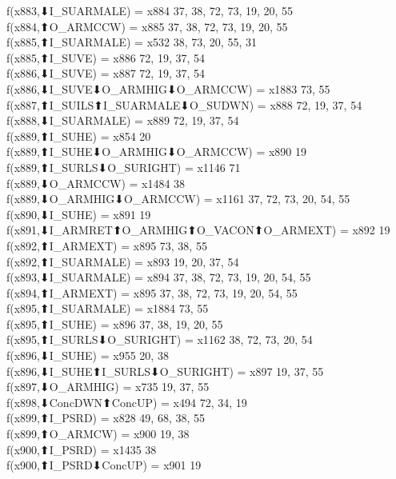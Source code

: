 f(x883,⬇I_SUARMALE) = x884 {37, 38, 72, 73, 19, 20, 55} \\
f(x884,⬆O_ARMCCW) = x885 {37, 38, 72, 73, 19, 20, 55} \\
f(x885,⬆I_SUARMALE) = x532 {38, 73, 20, 55, 31} \\
f(x885,⬆I_SUVE) = x886 {72, 19, 37, 54} \\
f(x886,⬇I_SUVE) = x887 {72, 19, 37, 54} \\
f(x886,⬇I_SUVE⬇O_ARMHIG⬇O_ARMCCW) = x1883 {73, 55} \\
f(x887,⬆I_SUILS⬆I_SUARMALE⬇O_SUDWN) = x888 {72, 19, 37, 54} \\
f(x888,⬇I_SUARMALE) = x889 {72, 19, 37, 54} \\
f(x889,⬆I_SUHE) = x854 {20} \\
f(x889,⬆I_SUHE⬇O_ARMHIG⬇O_ARMCCW) = x890 {19} \\
f(x889,⬆I_SURLS⬇O_SURIGHT) = x1146 {71} \\
f(x889,⬇O_ARMCCW) = x1484 {38} \\
f(x889,⬇O_ARMHIG⬇O_ARMCCW) = x1161 {37, 72, 73, 20, 54, 55} \\
f(x890,⬇I_SUHE) = x891 {19} \\
f(x891,⬇I_ARMRET⬆O_ARMHIG⬆O_VACON⬆O_ARMEXT) = x892 {19} \\
f(x892,⬆I_ARMEXT) = x895 {73, 38, 55} \\
f(x892,⬆I_SUARMALE) = x893 {19, 20, 37, 54} \\
f(x893,⬇I_SUARMALE) = x894 {37, 38, 72, 73, 19, 20, 54, 55} \\
f(x894,⬆I_ARMEXT) = x895 {37, 38, 72, 73, 19, 20, 54, 55} \\
f(x895,⬆I_SUARMALE) = x1884 {73, 55} \\
f(x895,⬆I_SUHE) = x896 {37, 38, 19, 20, 55} \\
f(x895,⬆I_SURLS⬇O_SURIGHT) = x1162 {38, 72, 73, 20, 54} \\
f(x896,⬇I_SUHE) = x955 {20, 38} \\
f(x896,⬇I_SUHE⬆I_SURLS⬇O_SURIGHT) = x897 {19, 37, 55} \\
f(x897,⬇O_ARMHIG) = x735 {19, 37, 55} \\
f(x898,⬇ConcDWN⬆ConcUP) = x494 {72, 34, 19} \\
f(x899,⬆I_PSRD) = x828 {49, 68, 38, 55} \\
f(x899,⬆O_ARMCW) = x900 {19, 38} \\
f(x900,⬆I_PSRD) = x1435 {38} \\
f(x900,⬆I_PSRD⬇ConcUP) = x901 {19} \\
